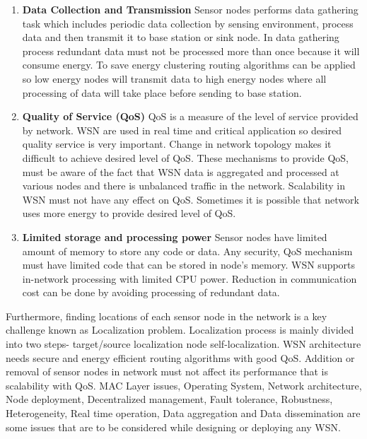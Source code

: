 \begin{enumerate}[label=\textbf{\roman*}]
    \item \textbf{Data Collection and Transmission }
    Sensor nodes performs data gathering task which includes periodic data collection by sensing environment, process data and then transmit it to base station or sink node. In data gathering process redundant data must not be processed more than once because it will consume energy. To save energy clustering routing algorithms can be applied so low energy nodes will transmit data to high energy nodes where all processing of data will take place before sending to base station.
    \item \textbf{Quality of Service (QoS) }
    QoS is a measure of the level of service provided by network. WSN are used in real time and critical application so desired quality service is very important. Change in network topology makes it difficult to achieve desired level of QoS. These mechanisms to provide QoS, must be aware of the fact that WSN data is aggregated and processed at various nodes and there is unbalanced traffic in the network. Scalability in WSN must not have any effect on QoS. Sometimes it is possible that network uses more energy to provide desired level of QoS.
    \item \textbf{Limited storage and processing power }
    Sensor nodes have limited amount of memory to store any code or data. Any security, QoS mechanism must have limited code that can be stored in node’s memory. WSN supports in-network processing with limited CPU power. Reduction in communication cost can be done by avoiding processing of redundant data.
\end{enumerate}
Furthermore, finding locations of each sensor node in the network is a key challenge known as Localization problem. Localization process is mainly divided into two steps- target/source localization node self-localization. WSN architecture needs secure and energy efficient routing algorithms with good QoS. Addition or removal of sensor nodes in network must not affect its performance that is scalability with QoS. MAC Layer issues, Operating System, Network  architecture, Node deployment, Decentralized management, Fault tolerance, Robustness, Heterogeneity, Real time operation, Data aggregation and Data dissemination are some issues that are to be considered while designing or deploying any WSN.

